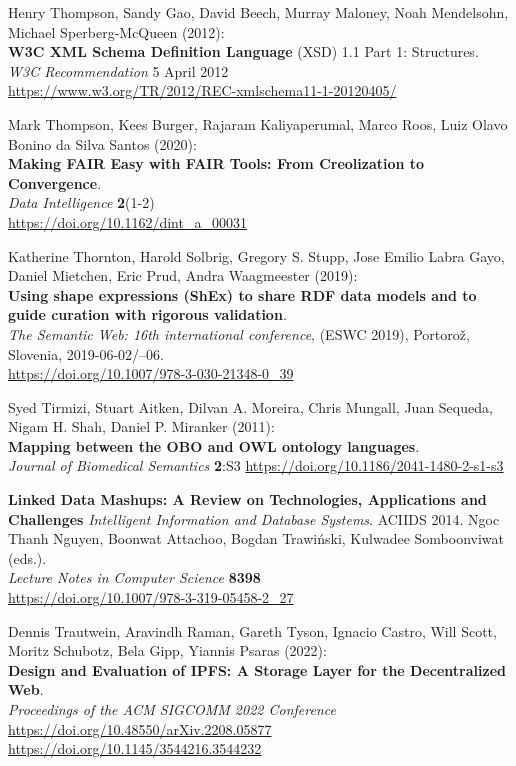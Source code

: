 \begin{thebibliography}{9}
Henry Thompson, Sandy Gao, David Beech, Murray Maloney, Noah Mendelsohn, Michael Sperberg-McQueen (2012):\\
\textbf{W3C XML Schema Definition Language} ({XSD}) 1.1 {Part} 1: {Structures}. \\
\emph{W3C Recommendation} 5 April 2012 \\
\url{https://www.w3.org/TR/2012/REC-xmlschema11-1-20120405/}

Mark Thompson, Kees Burger, Rajaram Kaliyaperumal, Marco Roos, Luiz Olavo Bonino da Silva Santos (2020):\\
\textbf{Making FAIR Easy with FAIR Tools: From Creolization to Convergence}.\\
\emph{Data Intelligence} \textbf{2}(1-2)\\
\url{https://doi.org/10.1162/dint_a_00031}

Katherine Thornton, Harold Solbrig, Gregory S. Stupp, Jose Emilio Labra
Gayo, Daniel Mietchen, Eric Prud, Andra Waagmeester (2019):\\
\textbf{Using shape expressions ({ShEx}) to share {RDF} data models and
to guide curation with rigorous validation}. \\
\emph{The Semantic Web: 16th international conference}, (ESWC 2019), Portorož, Slovenia,
2019-06-02/--06.\\
\url{https://doi.org/10.1007/978-3-030-21348-0_39}


Syed Tirmizi, Stuart Aitken, Dilvan A. Moreira, Chris Mungall, Juan
Sequeda, Nigam H. Shah, Daniel P. Miranker (2011): \\
\textbf{Mapping between the {OBO} and {OWL} ontology languages}. \\
\emph{Journal of Biomedical Semantics} \textbf{2}:S3
\url{https://doi.org/10.1186/2041-1480-2-s1-s3}

\textbf{Linked Data Mashups: A Review on Technologies, Applications and Challenges}
\emph{Intelligent Information and Database Systems}. ACIIDS 2014. Ngoc Thanh Nguyen, Boonwat Attachoo, Bogdan Trawiński, Kulwadee Somboonviwat (eds.).\\
\emph{Lecture Notes in Computer Science} \textbf{8398}\\
\url{https://doi.org/10.1007/978-3-319-05458-2_27}

Dennis Trautwein, Aravindh Raman, Gareth Tyson, Ignacio Castro, Will Scott, Moritz Schubotz, Bela Gipp, Yiannis Psaras (2022):\\
\textbf{Design and Evaluation of IPFS: A Storage Layer for the Decentralized Web}.\\
\emph{Proceedings of the {ACM} {SIGCOMM} 2022 Conference}\\
\url{https://doi.org/10.48550/arXiv.2208.05877}\\
\url{https://doi.org/10.1145/3544216.3544232}


\end{thebibliography}
